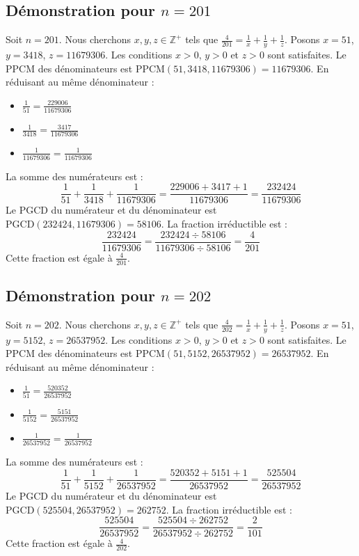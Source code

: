 \documentclass[11pt,a4paper]{article}
\begin{document}
\subsection{Démonstration pour $n = 201$}
Soit $n = 201$. Nous cherchons $x, y, z \in \mathbb{Z}^{+}$ tels que $\frac{4}{201} = \frac{1}{x} + \frac{1}{y} + \frac{1}{z}$.
Posons $x = 51$, $y = 3418$, $z = 11679306$.
Les conditions $x > 0$, $y > 0$ et $z > 0$ sont satisfaites.
Le PPCM des dénominateurs est $\text{PPCM}(51, 3418, 11679306) = 11679306$.
En réduisant au même dénominateur :
\begin{itemize}
    \item $\frac{1}{51} = \frac{229006}{11679306}$
    \item $\frac{1}{3418} = \frac{3417}{11679306}$
    \item $\frac{1}{11679306} = \frac{1}{11679306}$
\end{itemize}
La somme des numérateurs est :
$$ \frac{1}{51} + \frac{1}{3418} + \frac{1}{11679306} = \frac{229006 + 3417 + 1}{11679306} = \frac{232424}{11679306} $$
Le PGCD du numérateur et du dénominateur est $\text{PGCD}(232424, 11679306) = 58106$.
La fraction irréductible est :
$$ \frac{232424}{11679306} = \frac{232424 \div 58106}{11679306 \div 58106} = \frac{4}{201} $$
Cette fraction est égale à $\frac{4}{201}$.

\subsection{Démonstration pour $n = 202$}
Soit $n = 202$. Nous cherchons $x, y, z \in \mathbb{Z}^{+}$ tels que $\frac{4}{202} = \frac{1}{x} + \frac{1}{y} + \frac{1}{z}$.
Posons $x = 51$, $y = 5152$, $z = 26537952$.
Les conditions $x > 0$, $y > 0$ et $z > 0$ sont satisfaites.
Le PPCM des dénominateurs est $\text{PPCM}(51, 5152, 26537952) = 26537952$.
En réduisant au même dénominateur :
\begin{itemize}
    \item $\frac{1}{51} = \frac{520352}{26537952}$
    \item $\frac{1}{5152} = \frac{5151}{26537952}$
    \item $\frac{1}{26537952} = \frac{1}{26537952}$
\end{itemize}
La somme des numérateurs est :
$$ \frac{1}{51} + \frac{1}{5152} + \frac{1}{26537952} = \frac{520352 + 5151 + 1}{26537952} = \frac{525504}{26537952} $$
Le PGCD du numérateur et du dénominateur est $\text{PGCD}(525504, 26537952) = 262752$.
La fraction irréductible est :
$$ \frac{525504}{26537952} = \frac{525504 \div 262752}{26537952 \div 262752} = \frac{2}{101} $$
Cette fraction est égale à $\frac{4}{202}$.
\end{document}
